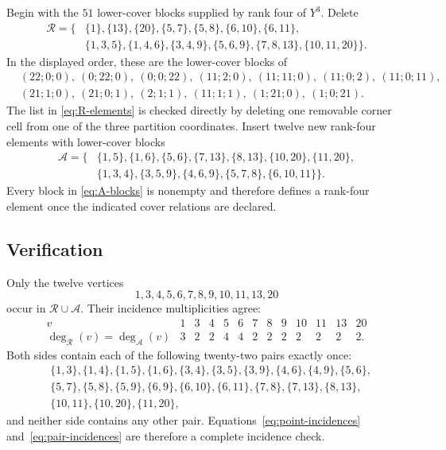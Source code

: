 \documentclass[10pt,a4paper]{amsart}
\newcommand{\Rcal}{\mathcal{R}}
\newcommand{\Acal}{\mathcal{A}}
\begin{document}
Begin with the $51$ lower-cover blocks supplied by rank four of $Y^3$. Delete
\begin{equation}\label{eq:R-blocks}
\begin{aligned}
\Rcal=\{&\{1\},\{13\},\{20\},\{5,7\},\{5,8\},\{6,10\},\{6,11\},\\
&\{1,3,5\},\{1,4,6\},\{3,4,9\},\{5,6,9\},\{7,8,13\},\{10,11,20\}\}.
\end{aligned}
\end{equation}
In the displayed order, these are the lower-cover blocks of
\begin{equation}\label{eq:R-elements}
\begin{aligned}
 &(22;0;0),\ (0;22;0),\ (0;0;22),\ (11;2;0),\ (11;11;0),\ (11;0;2),\ (11;0;11),\\
 &(21;1;0),\ (21;0;1),\ (2;1;1),\ (11;1;1),\ (1;21;0),\ (1;0;21).
\end{aligned}
\end{equation}
The list in \eqref{eq:R-elements} is checked directly by deleting one removable corner cell from one of the three partition coordinates.
Insert twelve new rank-four elements with lower-cover blocks
\begin{equation}\label{eq:A-blocks}
\begin{aligned}
\Acal=\{&\{1,5\},\{1,6\},\{5,6\},\{7,13\},\{8,13\},\{10,20\},\{11,20\},\\
&\{1,3,4\},\{3,5,9\},\{4,6,9\},\{5,7,8\},\{6,10,11\}\}.
\end{aligned}
\end{equation}
Every block in \eqref{eq:A-blocks} is nonempty and therefore defines a rank-four element once the indicated cover relations are declared.

\subsection{Verification}

Only the twelve vertices
\[
  1,3,4,5,6,7,8,9,10,11,13,20
\]
occur in $\Rcal\cup\Acal$. Their incidence multiplicities agree:
\begin{equation}\label{eq:point-incidences}
\begin{array}{c|rrrrrrrrrrrr}
 v&1&3&4&5&6&7&8&9&10&11&13&20\\
\hline
 \deg_{\Rcal}(v)=\deg_{\Acal}(v)&3&2&2&4&4&2&2&2&2&2&2&2.
\end{array}
\end{equation}
Both sides contain each of the following twenty-two pairs exactly once:
\begin{equation}\label{eq:pair-incidences}
\begin{aligned}
&\{1,3\},\{1,4\},\{1,5\},\{1,6\},\{3,4\},\{3,5\},\{3,9\},\{4,6\},\{4,9\},\{5,6\},\\
&\{5,7\},\{5,8\},\{5,9\},\{6,9\},\{6,10\},\{6,11\},\{7,8\},\{7,13\},\{8,13\},\\
&\{10,11\},\{10,20\},\{11,20\},
\end{aligned}
\end{equation}
and neither side contains any other pair. Equations~\eqref{eq:point-incidences} and~\eqref{eq:pair-incidences} are therefore a complete incidence check.
\end{document}
